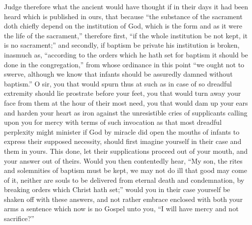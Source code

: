 Judge therefore what the ancient would have thought if in their days it had been heard which is published in ours, that because “the substance of the sacrament doth chiefly depend on the institution of God, which is the form and as it were the life of the sacrament,” therefore first, “if the whole institution be not kept, it is no sacrament;” and secondly, if baptism be private his institution is broken, inasmuch as, “according to the orders which he hath set for baptism it should be done in the congregation,” from whose ordinance in this point “we ought not to swerve, although we know that infants should be assuredly damned without baptism.” O sir, you that would spurn thus at such as in case of so dreadful extremity should lie prostrate before your feet, you that would turn away your face from them at the hour of their most need, you that would dam up your ears and harden your heart as iron against the unresistible cries of supplicants calling upon you for mercy with terms of such invocation as that most dreadful perplexity might minister if God by miracle did open the mouths of infants to express their supposed necessity, should first imagine yourself in their case and them in yours. This done, let their supplications proceed out of your mouth, and your answer out of theirs. Would you then contentedly hear, “My son, the rites and solemnities of baptism must be kept, we may not do ill that good may come of it, neither are souls to be delivered from eternal death and condemnation, by breaking orders which Christ hath set;” would you in their case yourself be shaken off with these answers, and not rather embrace enclosed  with both your arms a sentence which now is no Gospel unto you, “I will have mercy and not sacrifice?”
